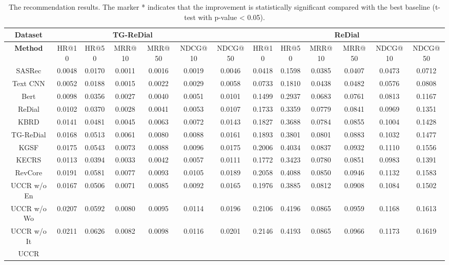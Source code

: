 \documentclass[sigconf,natbib=true]{acmart}
\begin{document}
\begin{table*}[!th]
	\small
	\centering
\setlength{\tabcolsep}{3pt}
	\caption{The recommendation results. The marker * indicates that the improvement is statistically significant compared with the best baseline (t-test with p-value < 0.05).} \label{rec_results}
	\begin{tabular}{@{}c|cccccc|cccccc@{}}
		\toprule
		Dataset & \multicolumn{5}{c}{TG-ReDial} & & \multicolumn{6}{c}{ReDial}\\
		\midrule
		\textbf{Method} & HR@10 & HR@50 & MRR@10 & MRR@50 & NDCG@10 & NDCG@50 & HR@10 & HR@50 & MRR@10 & MRR@50 & NDCG@10 & NDCG@50 \\
		\midrule
		
		SASRec & 0.0048 & 0.0170 & 0.0011 & 0.0016 & 0.0019 & 0.0046 & 0.0418 & 0.1598 & 0.0385 & 0.0407 & 0.0473 & 0.0712 \\
		Text CNN & 0.0052 & 0.0188 & 0.0015 & 0.0022 & 0.0029 & 0.0058 & 0.0733 & 0.1810 & 0.0438 & 0.0482 & 0.0576 & 0.0808 \\
		Bert & 0.0098 & 0.0356 & 0.0027 & 0.0040 & 0.0051 & 0.0101 & 0.1499 & 0.2937 & 0.0683 & 0.0761 & 0.0813 & 0.1167 \\
		ReDial & 0.0102 & 0.0370 & 0.0028 & 0.0041 & 0.0053 & 0.0107 & 0.1733 & 0.3359 & 0.0779 & 0.0841 & 0.0969 & 0.1351 \\
		KBRD & 0.0141 & 0.0481 & 0.0045 & 0.0063 & 0.0072 & 0.0143 & 0.1827 & 0.3688 & 0.0784 & 0.0855 & 0.1004 & 0.1428 \\
		TG-ReDial & 0.0168 & 0.0513 & 0.0061 & 0.0080 & 0.0088 & 0.0161 & 0.1893 & 0.3801 & 0.0801 & 0.0883 & 0.1032 & 0.1477 \\
		KGSF & 0.0175 & 0.0543 & 0.0073 & 0.0088 & 0.0096 & 0.0175 & 0.2006 & 0.4034 & 0.0837 & 0.0932 & 0.1110 & 0.1556 \\
		KECRS & 0.0113 & 0.0394 & 0.0033 & 0.0042 & 0.0057 & 0.0111 & 0.1772 & 0.3423 & 0.0780 & 0.0851 & 0.0983 & 0.1391 \\
		RevCore & 0.0191 & 0.0581 & 0.0077 & 0.0093 & 0.0105 & 0.0189 & 0.2058 & 0.4088 & 0.0850 & 0.0946 & 0.1132 & 0.1583 \\
		\midrule
		UCCR w/o En & 0.0167 & 0.0506 & 0.0071 & 0.0085 & 0.0092 & 0.0165 & 0.1976 & 0.3885 & 0.0812 & 0.0908 & 0.1084 & 0.1502 \\
		UCCR w/o Wo & 0.0207 & 0.0592 & 0.0080 & 0.0095 & 0.0114 & 0.0196 & 0.2106 & 0.4196 & 0.0865 & 0.0959 & 0.1168 & 0.1613 \\
		UCCR w/o It & 0.0211 & 0.0626 & 0.0082 & 0.0098 & 0.0116 & 0.0201 & 0.2146 & 0.4193 & 0.0865 & 0.0966 & 0.1173 & 0.1619 \\
UCCR &  &  &  &  &  &  &  &  &  &  &  &  \\
		\bottomrule
	\end{tabular}
\end{table*}
\end{document}

